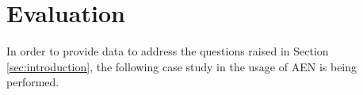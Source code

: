 %
%
%

\section{Evaluation}
\label{sec:evaluation}
In order to provide data to address the questions raised in Section
\ref{sec:introduction}, the following case study in the usage of AEN is
being performed.

